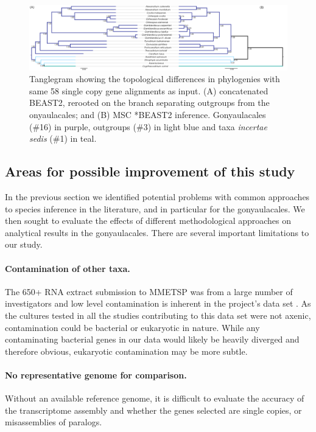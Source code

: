 \documentclass[12pt]{article}
\begin{document}
\begin{figure} 
\includegraphics[scale=.25]{figures/SC-MSC-BI_vs_SC-concat-BI.png} 
\caption{Tanglegram showing the topological differences in phylogenies with same 58 single copy gene alignments as input. (A) concatenated BEAST2, rerooted on the branch separating outgroups from the onyaulacales; and (B) MSC *BEAST2 inference. Gonyaulacales (\#16) in purple, outgroups (\#3) in light blue and taxa \textit{incertae sedis} (\#1) in teal.} 
\label{fig:tangleconcatBI}
\end{figure} 
\FloatBarrier

\subsection{Areas for possible improvement of this study}
In the previous section we identified potential problems with common approaches to species inference in the literature, and in particular for the gonyaulacales. 
We then sought to evaluate the effects of different methodological approaches on analytical results in the gonyaulacales. 
There are several important limitations to our study. 
\paragraph{Contamination of other taxa.} 
The 650+ RNA extract submission to MMETSP was from a large number of investigators and low level contamination is inherent in the project's data set \cite{keeling2014marine}. 
As the cultures tested in all the studies contributing to this data set were not axenic, contamination could be bacterial or eukaryotic in nature. 
While any contaminating bacterial genes in our data would likely be heavily diverged and therefore obvious, eukaryotic contamination may be more subtle.
\paragraph{No representative genome for comparison.} 
Without an available reference genome, it is difficult to evaluate the accuracy of the transcriptome assembly and whether the genes selected are single copies, or misassemblies of paralogs.
\end{document}
